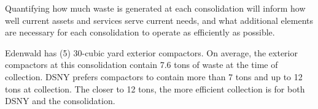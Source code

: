 
    Quantifying how much waste is generated at each consolidation will inform how well current assets and services serve current needs, and what additional elements are necessary for each consolidation to operate as efficiently as possible.
    
    Edenwald has (5) 30-cubic yard exterior compactors. On average, the exterior compactors at this consolidation contain 7.6 tons of waste at the time of collection. DSNY prefers compactors to contain more than 7 tons and up to 12 tons at collection. The closer to 12 tons, the more efficient collection is for both DSNY and the consolidation.